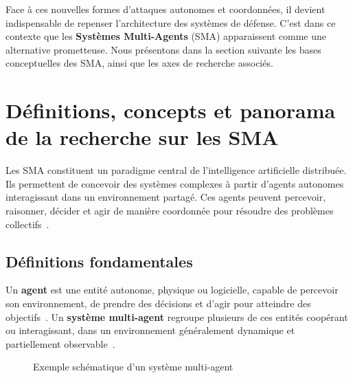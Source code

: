 \documentclass[ twoside,openright,titlepage,numbers=noenddot,headinclude,%
                footinclude=true,cleardoublepage=empty,abstractoff, %
                BCOR=5mm,paper=a4,fontsize=11pt,%
                french,american,%
                ]{scrreprt}
\begin{document}
\noindent
Face à ces nouvelles formes d'attaques autonomes et coordonnées, il devient indispensable de repenser l'architecture des systèmes de défense. C'est dans ce contexte que les \textbf{Systèmes Multi-Agents} (SMA) apparaissent comme une alternative prometteuse. Nous présentons dans la section suivante les bases conceptuelles des SMA, ainsi que les axes de recherche associés.

\section{Définitions, concepts et panorama de la recherche sur les SMA}\label{sec:sma-concepts}


Les SMA constituent un paradigme central de l'intelligence artificielle distribuée. Ils permettent de concevoir des systèmes complexes à partir d'agents autonomes interagissant dans un environnement partagé. Ces agents peuvent percevoir, raisonner, décider et agir de manière coordonnée pour résoudre des problèmes collectifs~\cite{Ferber1999,Wooldridge2009}.

\subsection*{Définitions fondamentales}

Un \textbf{agent} est une entité autonome, physique ou logicielle, capable de percevoir son environnement, de prendre des décisions et d'agir pour atteindre des objectifs~\cite{Russell2010}. Un \textbf{système multi-agent} regroupe plusieurs de ces entités coopérant ou interagissant, dans un environnement généralement dynamique et partiellement observable~\cite{Jennings1998,Shoham2009}.

\begin{figure}[h]
    \centering
    \caption{Exemple schématique d'un système multi-agent}
    \label{fig:sma_architecture}
\end{figure}
\end{document}
